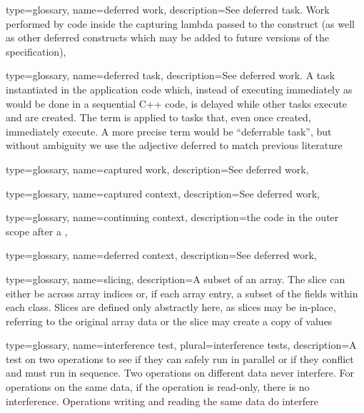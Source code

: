 {
  type=glossary,
  name={deferred work},
  description={See \gls{deferred task}. Work
performed by code inside the capturing lambda passed to the
 construct (as well as other deferred constructs which
may be added to future versions of the specification)},
}

{
  type=glossary,
  name={deferred task},
  description={See \gls{deferred work}. A \gls{task} instantiated in the application code
  which, instead of executing immediately as would be done in a sequential C++ code,
  is delayed while other tasks execute and are created.
  The term is applied to tasks that, even once created, immediately execute.
  A more precise term would be ``deferrable task'', but without ambiguity
  we use the adjective deferred to match previous literature}
}

{
  type=glossary,
  name={captured work},
  description={See \gls{deferred work}},
}

{
  type=glossary,
  name={captured context},
  description={See \gls{deferred work}},
}

{
  type=glossary,
  name={continuing context},
  description={the code in the outer scope after a },
}

{
  type=glossary,
  name={deferred context},
  description={See \gls{deferred work}},
}

{
  type={glossary},
  name={slicing},
  description={A subset of an array. The slice can either be across array indices or, if each array entry, a subset of the fields within each class.  Slices are defined only abstractly here, as slices may be in-place, referring to the original array data
  or the slice may create a copy of values}
}

{
  type={glossary},
  name={interference test},
  plural={interference tests},
  description={A test on two operations to see if they can safely run in parallel or if they conflict and must run in sequence.
    Two operations on different data never interfere.
    For operations on the same data, if the operation is read-only, there is no interference.
    Operations writing and reading the same data do interfere}
}



